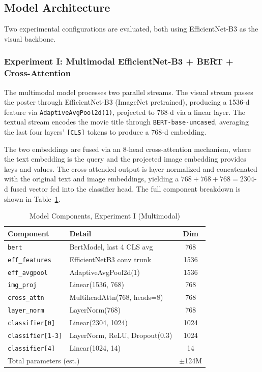 \documentclass[conference]{IEEEtran}
\begin{document}
\subsection{Model Architecture}

Two experimental configurations are evaluated, both using 
EfficientNet-B3 as the visual backbone.

\subsubsection{Experiment I: Multimodal EfficientNet-B3 + BERT + 
Cross-Attention}


The multimodal model processes two parallel streams. The visual stream 
passes the poster through EfficientNet-B3 (ImageNet pretrained), 
producing a 1536-d feature via \texttt{AdaptiveAvgPool2d(1)}, projected 
to 768-d via a linear layer. The textual stream encodes the movie title 
through \texttt{BERT-base-uncased}, averaging the last four layers' 
\texttt{[CLS]} tokens to produce a 768-d embedding.

The two embeddings are fused via an 8-head cross-attention mechanism, 
where the text embedding is the query and the projected image embedding 
provides keys and values. The cross-attended output is layer-normalized 
and concatenated with the original text and image embeddings, yielding 
a $768 + 768 + 768 = 2304$-d fused vector fed into the classifier head. 
The full component breakdown is shown in Table~\ref{tab:arch_exp1}.

\begin{table}[!t]
\caption{Model Components, Experiment I (Multimodal)}
\label{tab:arch_exp1}
\begin{center}
\small
\begin{tabular}{lp{3.2cm}c}
\hline
\textbf{Component} & \textbf{Detail} & \textbf{Dim} \\
\hline
\texttt{bert}            & BertModel, last 4 CLS avg        & 768  \\
\texttt{eff\_features}   & EfficientNetB3 conv trunk        & 1536 \\
\texttt{eff\_avgpool}    & AdaptiveAvgPool2d(1)             & 1536 \\
\texttt{img\_proj}       & Linear(1536, 768)                & 768  \\
\texttt{cross\_attn}     & MultiheadAttn(768, heads=8)      & 768  \\
\texttt{layer\_norm}     & LayerNorm(768)                   & 768  \\
\texttt{classifier[0]}   & Linear(2304, 1024)               & 1024 \\
\texttt{classifier[1-3]} & LayerNorm, ReLU, Dropout(0.3)   & 1024 \\
\texttt{classifier[4]}   & Linear(1024, 14)                 & 14   \\
\hline
\multicolumn{2}{l}{Total parameters (est.)} & $\pm$124M \\
\hline
\end{tabular}
\end{center}
\end{table}
\end{document}
